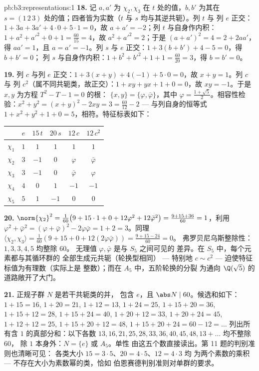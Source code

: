 \begin{solution}{pb:b3:representations:1}
\textbf{18.} 记 $a, a'$ 为 $\chi_2, \chi_3$ 在
$t$ 处的值，$b, b'$ 为其在 $s = (1\,2\,3)$ 处的值；四者皆为实数（$t$
与 $s$ 均与其逆共轭）。列 $t$ 与
列 $e$ 正交：$1 + 3a + 3a' + 4\cdot0 + 5\cdot1 = 0$，故 $a + a'
= -2$；列 $t$ 与自身作内积：$1 + a^2 + a'^2 + 0 + 1 =
\frac{60}{15} = 4$，故 $a^2 + a'^2 = 2$；于是 $(a + a')^2 = 4
= 2 + 2aa'$，得 $aa' = 1$，且 $a = a' = -1$。列 $s$
与 $e$ 正交：$1 + 3(b + b') + 4 - 5 = 0$，得 $b + b' = 0$；
列 $s$ 与自身作内积：$1 + b^2 + b'^2 + 1 + 1 = \frac{60}
{20} = 3$，得 $b = b' = 0$。

\textbf{19.} 列 $c$ 与列 $e$ 正交：$1 + 3(x + y) +
4(-1) + 5\cdot0 = 0$，故 $x + y = 1$。列 $c$ 与
列 $c^2$（属不同共轭类，故正交）：$1 + xy + yx + 1
+ 0 = 0$，故 $xy = -1$。于是 $x, y$ 为方程 $T^2 - T - 1 = 0$ 的根：
$\{x, y\} = \{\varphi, \bar\varphi\}$，其中 $\varphi = \frac{1 +
\sqrt5}2$。相容性检验：$x^2 + y^2 = (x+y)^2 - 2xy = 3 =
\frac{60}{12} - 2$ --- 与列自身的恒等式 $1 +
x^2 + y^2 + 1 + 0 = 5$，相符。特征标表如下：
\begin{center}
\begin{tabular}{c|ccccc}
 & $e$ & $15\,t$ & $20\,s$ & $12\,c$ & $12\,c^2$\\
\hline
$\chi_1$ & $1$ & $1$ & $1$ & $1$ & $1$\\
$\chi_2$ & $3$ & $-1$ & $0$ & $\varphi$ & $\bar\varphi$\\
$\chi_3$ & $3$ & $-1$ & $0$ & $\bar\varphi$ & $\varphi$\\
$\chi_4$ & $4$ & $0$ & $1$ & $-1$ & $-1$\\
$\chi_5$ & $5$ & $1$ & $-1$ & $0$ & $0$\\
\end{tabular}
\end{center}

\textbf{20.} $\norm{\chi_2}^2 = \frac1{60}\bigl(9 + 15\cdot1 +
0 + 12\varphi^2 + 12\bar\varphi^2\bigr) = \frac{9 + 15 +
36}{60} = 1$，利用 $\varphi^2 + \bar\varphi^2 = (\varphi +
\bar\varphi)^2 - 2\varphi\bar\varphi = 1 + 2 = 3$。同理
$\langle\chi_2, \chi_3\rangle = \frac1{60}(9 + 15 + 0 +
12(2\varphi\bar\varphi)) = \frac{9 + 15 - 24}{60} = 0$。
弗罗贝尼乌斯整除性：$1, 3, 3, 4, 5$ 均整除 $60$。
无理值 $\varphi, \bar\varphi$ 是与 $S_5$ 之间可见的
差异。在 $S_5$ 中，每个元素都与其循环群的
全部生成元共轭（轮换型相同）
--- 特别地 $c \sim c^2$ --- 迫使特征标值为有理数（实际上是
整数）；而在 $A_5$ 中，五阶轮换的分裂
为通向 $\Q(\sqrt5)$ 的道路敞开了大门。

\textbf{21.} 正规子群 $N$ 是若干共轭类的并，
包含 $e$，且 $\abs N \mid 60$。候选和如下：
$1{+}15 = 16$, $1{+}20 = 21$, $1{+}12 = 13$, $1{+}24 = 25$,
$1{+}15{+}20 = 36$, $1{+}15{+}12 = 28$, $1{+}15{+}24 = 40$,
$1{+}20{+}12 = 33$, $1{+}20{+}24 = 45$, $1{+}12{+}12 = 25$,
$1{+}15{+}20{+}12 = 48$, $1{+}15{+}20{+}24 = 60 - 12 = \dots$
列出所有含 $1$ 的真部分和：以下各数 $13, 16,
21, 25, 28, 33, 36, 40, 45, 48, 13{+}\dots$ 均不整除 $60$，
除 $1$ 本身外：$N = \{e\}$ 或 $A_5$。单性
由这五个数直接读出。第 11 题的判别准则也清晰可见：
各类大小 $15 = 3\cdot5$、$20 = 4\cdot5$、$12 = 4\cdot3$ 均
为两个素数的乘积 --- 不存在大小为素数幂的类，恰如
伯恩赛德判别准则对单群的要求。


\end{solution}
